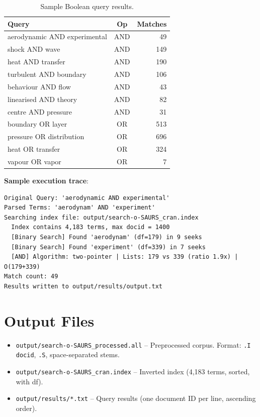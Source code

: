 \documentclass[12pt,a4paper]{article}
\begin{document}
\begin{table}[H]
\centering\small
\caption{Sample Boolean query results.}
\label{tab:query_results}
\begin{tabular}{@{}l c r@{}}
\toprule
\textbf{Query} & \textbf{Op} & \textbf{Matches} \\
\midrule
aerodynamic AND experimental & AND & 49 \\
shock AND wave & AND & 149 \\
heat AND transfer & AND & 190 \\
turbulent AND boundary & AND & 106 \\
behaviour AND flow & AND & 43 \\
linearised AND theory & AND & 82 \\
centre AND pressure & AND & 31 \\
boundary OR layer & OR & 513 \\
pressure OR distribution & OR & 696 \\
heat OR transfer & OR & 324 \\
vapour OR vapor & OR & 7 \\
\bottomrule
\end{tabular}
\end{table}

\textbf{Sample execution trace}:
\begin{lstlisting}[style=outputstyle,numbers=none]
Original Query: 'aerodynamic AND experimental'
Parsed Terms: 'aerodynam' AND 'experiment'
Searching index file: output/search-o-SAURS_cran.index
  Index contains 4,183 terms, max docid = 1400
  [Binary Search] Found 'aerodynam' (df=179) in 9 seeks
  [Binary Search] Found 'experiment' (df=339) in 7 seeks
  [AND] Algorithm: two-pointer | Lists: 179 vs 339 (ratio 1.9x) | O(179+339)
Match count: 49
Results written to output/results/output.txt
\end{lstlisting}

\section{Output Files}
\label{sec:output}

\begin{itemize}[noitemsep]
  \item \texttt{output/search-o-SAURS\_processed.all} -- Preprocessed corpus.
        Format: \texttt{.I docid}, \texttt{.S}, space-separated stems.
  \item \texttt{output/search-o-SAURS\_cran.index} -- Inverted index (4,183 terms,
        sorted, with df).
  \item \texttt{output/results/*.txt} -- Query results (one document ID per line,
        ascending order).
\end{itemize}
\end{document}
